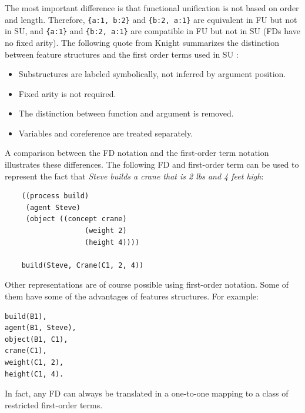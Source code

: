 \documentclass[10pt,a4paper]{report}
\begin{document}
The most important difference is that functional unification is not based
on order and length.  Therefore, {\tt \{a:1, b:2\}} and {\tt \{b:2, a:1\}} are
equivalent in FU but not in SU, and {\tt \{a:1\}} and {\tt \{b:2, a:1\}} are
compatible in FU but not in SU (FDs have no fixed arity).  The following
quote from Knight summarizes the distinction between feature structures and
the first order terms used in SU  \cite[p.105]{Knight}:
\begin{itemize}
\item Substructures are labeled symbolically, not inferred by argument position.

\item Fixed arity is not required.

\item The distinction between function and argument is removed.

\item Variables and coreference are treated separately.
\end{itemize}

A comparison between the FD notation and the first-order term notation
illustrates these differences.  The following FD and first-order term can
be used to represent the fact that {\em Steve builds a crane that is 2 lbs
and 4 feet high}:

\begin{lstlisting}
	((process build)
	 (agent Steve)
	 (object ((concept crane)
                   (weight 2)
                   (height 4))))

	build(Steve, Crane(C1, 2, 4))
\end{lstlisting}

Other representations are of course possible using first-order notation.  Some of them have some of
the advantages of features structures.  For example: 
\begin{lstlisting}
build(B1), 
agent(B1, Steve), 
object(B1, C1), 
crane(C1), 
weight(C1, 2), 
height(C1, 4).
\end{lstlisting}
In fact, any FD can always be translated in a one-to-one mapping to a class of restricted first-order terms.
\end{document}
